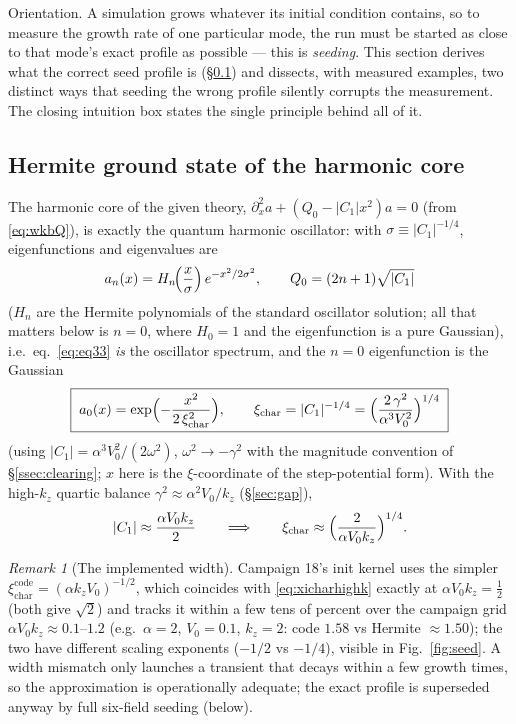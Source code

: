 \documentclass[11pt,a4paper]{article}
\numberwithin{equation}{section}
\theoremstyle{remark}
\newtheorem{remark}[lemma]{Remark}
\newcommand{\Vo}{V_0}
\newcommand{\kz}{k_z}
\begin{document}
Orientation. A simulation grows whatever its initial condition
contains, so to measure the growth rate of one particular mode, the run
must be started as close to that mode's exact profile as possible ---
this is \emph{seeding}. This section derives what the correct seed
profile is (\S\ref{ssec:hermite}) and dissects, with measured examples,
two distinct ways that seeding the wrong profile silently corrupts the
measurement. The closing intuition box states the single principle
behind all of it.

\subsection{Hermite ground state of the harmonic core}
\label{ssec:hermite}

The harmonic core of the given theory,
$\partial_x^2a+(Q_0-|C_1|x^2)a=0$ (from \eqref{eq:wkbQ}), is exactly the
quantum harmonic oscillator: with $\sigma\equiv|C_1|^{-1/4}$,
eigenfunctions and eigenvalues are
\begin{equation}
a_n(x)=H_n\!\Bigl(\frac{x}{\sigma}\Bigr)\,
e^{-x^2/2\sigma^2},
\qquad
Q_0=(2n+1)\sqrt{|C_1|}
\end{equation}
($H_n$ are the Hermite polynomials of the standard oscillator solution;
all that matters below is $n=0$, where $H_0=1$ and the eigenfunction is
a pure Gaussian),
i.e.\ eq.~\eqref{eq:eq33} \emph{is} the oscillator spectrum, and the
$n=0$ eigenfunction is the Gaussian
\begin{equation}
\boxed{\;
a_0(x)=\exp\Bigl(-\frac{x^2}{2\,\xi_{\mathrm{char}}^2}\Bigr),
\qquad
\xi_{\mathrm{char}}=|C_1|^{-1/4}
=\Bigl(\frac{2\,\gamma^2}{\alpha^3\Vo^2}\Bigr)^{1/4}
\;}
\label{eq:xichar}
\end{equation}
(using $|C_1|=\alpha^3\Vo^2/(2\omega^2)$, $\omega^2\to-\gamma^2$ with the
magnitude convention of \S\ref{ssec:clearing}; $x$ here is the
$\xi$-coordinate of the step-potential form). With the high-$\kz$ quartic
balance $\gamma^2\approx\alpha^2\Vo/\kz$ (\S\ref{sec:gap}),
\begin{equation}
|C_1|\approx\frac{\alpha\Vo\kz}{2}
\qquad\Longrightarrow\qquad
\xi_{\mathrm{char}}\approx\Bigl(\frac{2}{\alpha\Vo\kz}\Bigr)^{1/4}.
\label{eq:xicharhighk}
\end{equation}

\begin{remark}[The implemented width]
Campaign 18's init kernel uses the simpler
$\xi_{\mathrm{char}}^{\mathrm{code}}=(\alpha\kz\Vo)^{-1/2}$, which
coincides with \eqref{eq:xicharhighk} exactly at $\alpha\Vo\kz=\tfrac12$
(both give $\sqrt2$) and tracks it within a few tens of percent over the
campaign grid $\alpha\Vo\kz\approx0.1$--$1.2$ (e.g.\ $\alpha=2$,
$\Vo=0.1$, $\kz=2$: code $1.58$ vs Hermite $\approx1.50$); the two have
different scaling exponents ($-1/2$ vs $-1/4$), visible in
Fig.~\ref{fig:seed}. A width mismatch only launches a transient that
decays within a few growth times, so the approximation is operationally
adequate; the exact profile is superseded anyway by full six-field
seeding (below).
\end{remark}
\end{document}
